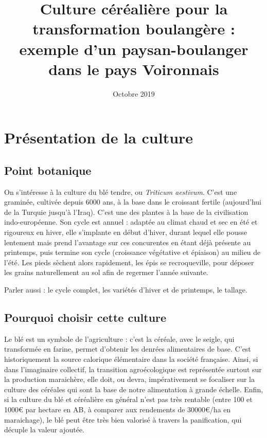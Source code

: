 \documentclass{article}
\title{Culture céréalière pour la transformation boulangère : exemple d'un paysan-boulanger dans le pays Voironnais}
\date{Octobre 2019}
\begin{document}
\maketitle

\section{Présentation de la culture}

\subsection{Point botanique}

On s'intéresse à la culture du blé tendre, ou \textit{Triticum aestivum}. C'est une graminée, cultivée depuis 6000 ans, à la base dans le croissant fertile (aujourd'hui de la Turquie jusqu'à l'Iraq). C'est une des plantes à la base de la civilisation indo-européenne. Son cycle est annuel : adaptée au climat chaud et sec en été et rigoureux en hiver, elle s'implante en début d'hiver, durant lequel elle pousse lentement mais prend l'avantage sur ces concurentes en étant déjà présente au printemps, puis termine son cycle (croissance végétative et épiaison) au milieu de l'été. Les pieds sèchent alors rapidement, les épis se recroqueville, pour déposer les grains naturellement au sol afin de regermer l'année suivante. 

Parler aussi : le cycle complet, les variétés d'hiver et de printemps, le tallage. 

\subsection{Pourquoi choisir cette culture}

Le blé est un symbole de l'agriculture : c'est la céréale, avec le seigle, qui transformée en farine, permet d'obtenir les denrées alimentaires de base. C'est historiquement la source calorique élémentaire dans la société française. Ainsi, si dans l'imaginaire collectif, la transition agroécologique est représentée surtout sur la production maraichère, elle doit, ou devra, impérativement se focaliser sur la culture des céréales qui sont la base de notre alimentation à grande échelle. Enfin, si la culture du blé et céréalière en général n'est pas très rentable (entre 100 et 1000\euro{} par hectare en AB, à comparer aux rendements de 30000\euro{}/ha en maraichage), le blé peut être très bien valorisé à travers la panification, qui décuple la valeur ajoutée. 
\end{document}
